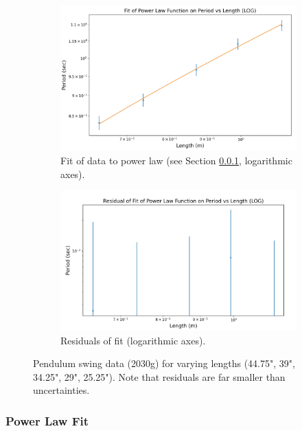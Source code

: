 \documentclass[12pt]{article}
\begin{document}
\begin{figure}[h]
    \centering
    \begin{subfigure}[b]{0.48\textwidth}
        \centering
        \includegraphics[width=\textwidth]{q4a_logfit.png}
        \caption{Fit of data to power law (see Section \ref{section:q4afit}, logarithmic axes).}
        \label{fig:q4alogfit}
    \end{subfigure}
    \hfill
    \begin{subfigure}[b]{0.48\textwidth}
        \centering
        \includegraphics[width=\textwidth]{q4a_logresiduals.png}
        \caption{Residuals of fit (logarithmic axes).}
        \label{fig:q4alogresiduals}
    \end{subfigure}
    \hfill
    \caption{Pendulum swing data (2030g) for varying lengths (44.75", 39", 34.25", 29", 25.25"). Note that residuals are far smaller than uncertainties.}
    \label{fig:q4alogfig}
\end{figure}
\subsubsection{Power Law Fit}
\label{section:q4afit}
\end{document}
